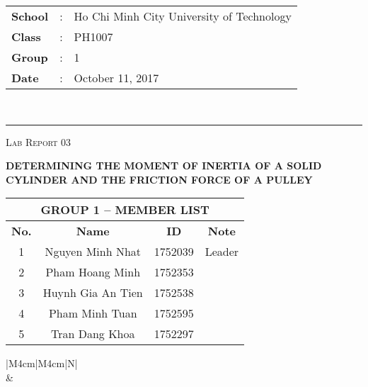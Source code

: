 \documentclass[12pt, a4paper]{article}
\begin{document}
\noindent
\begin{tabular}{lll}
    \textbf{School} & : & Ho Chi Minh City University of Technology \\
    \textbf{Class} & : & PH1007 \\
    \textbf{Group} & : & 1 \\
    \textbf{Date} & : & October 11, 2017 \\
\end{tabular}\\
\rule[2ex]{\textwidth}{2pt}

\vspace{2cm}

\begin{center}
    {\scshape\Large Lab Report 03 \par}
    \vspace{1.5cm}
    {\Huge\bfseries DETERMINING THE MOMENT OF INERTIA OF A SOLID CYLINDER AND THE FRICTION FORCE OF A PULLEY \par}

    \vspace{3cm}

    \begin{tabular}{|c|c|c|c|}
        \hline 
        \multicolumn{4}{|c|}{\textbf{GROUP 1 -- MEMBER LIST}} \\ 
        \hline 
        \textbf{No.} &\qquad\qquad \textbf{Name}\qquad\qquad\qquad & \qquad\textbf{ID}\qquad\qquad & \qquad\textbf{Note}\qquad\qquad \\ 
        \hline 
        1 & Nguyen Minh Nhat  & 1752039 & Leader \\ 
        \hline 
        2 & Pham Hoang Minh   & 1752353 &  \\ 
        \hline 
        3 & Huynh Gia An Tien & 1752538 &  \\ 
        \hline 
        4 & Pham Minh Tuan    & 1752595 &  \\ 
        \hline 
        5 & Tran Dang Khoa    & 1752297 &  \\ 
        \hline 
    \end{tabular} 

    \vspace{3cm}

    \begin{table}[ht]
        \centering
        \begin{tabular}{|M{4cm}|M{4cm}|N|}
            \hline
             \\
            \hline
             &  \\ [50pt]
            \hline
        \end{tabular}
    \end{table}
\end{center}
\end{document}
